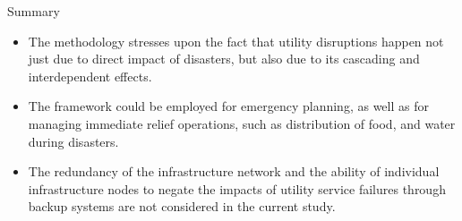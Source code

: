 \documentclass[ctrsize,landscape]{baposter}
\begin{document}
\begin{poster}
\begin{posterbox}[name=feedback,column=2,below=problems, above = foottext]{Summary}
  \begin{itemize}
    \item The methodology stresses upon the fact that utility disruptions happen not just due to direct impact of disasters, but also due to its cascading and interdependent effects.
    \item The framework could be employed for emergency planning, as well as for managing immediate relief operations, such as distribution of food, and water during disasters. 
    \item The redundancy of the infrastructure network and the ability of individual infrastructure nodes to negate the impacts of utility service failures through backup systems are not considered in the current study.
  \end{itemize}
\end{posterbox}


\end{poster}
\end{document}
